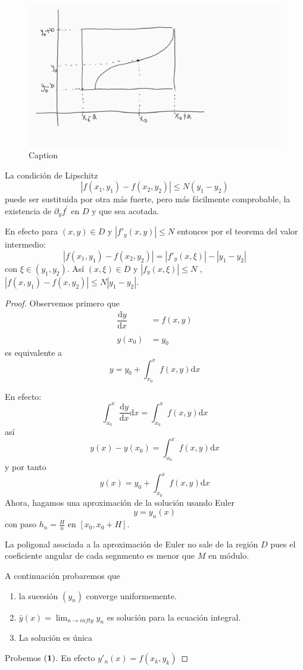 \begin{figure}[H]
    \centering
    \includegraphics[scale=0.25]{graficas1.png}
    \caption{Caption}
    \label{fig:my_label}
\end{figure}


La condici\'on de Lipschitz 
$$
|f(x_1,y_1)-f(x_2,y_2)|\leq N(y_1-y_2)
$$
puede ser sustituida por otra m\'as fuerte, pero m\'as f\'acilmente comprobable, la existencia de $\partial_{y} f^{'}$ en $D$ y que sea acotada.

En efecto para $(x,y)\in D$ y $|f'_y(x,y)|\leq N$ entonces por el teorema del valor intermedio:
$$
|f(x_1,y_1)-f(x_2,y_2)|=|f'_y(x,\xi)|-|y_1-y_2| 
$$
con $\xi\in (y_1,y_2)$. As\'i $(x,\xi)\in D$ y $|f_y(x,\xi)|\leq N$ , $|f(x,y_1)-f(x,y_2)|\leq N|y_1-y_2|$.

\begin{proof}
Observemos primero que 
$$
\left.\begin{array}{cc}
    \dfrac{\mathrm{d}y}{\mathrm{d}x}&=f(x,y)  \\
    &\\
    y(x_0) &=y_0 
\end{array}\right.
$$
es equivalente a
$$
y=y_0+\int_{x_0}^xf(x,y)\mathrm{d}x
$$

En efecto:
$$
\int_{x_0}^x\frac{\mathrm{d}y}{\mathrm{d}x}\mathrm{d}x=\int_{x_0}^xf(x,y)\mathrm{d}x
$$
así
$$
y(x)-y(x_0)=\int_{x_0}^xf(x,y)\mathrm{d}x
$$
y por tanto
$$
y(x)=y_0+\int_{x_0}^xf(x,y)\mathrm{d}x
$$
Ahora, hagamos una aproximaci\'on de  la soluci\'on usando Euler
$$
y=y_n(x)
$$
con paso $h_n=\frac{H}{n}$ en $[x_0,x_0+H]$.

La poligonal asociada a la aproximación de Euler no sale de la región $D$ pues el coeficiente angular de cada segnmento es menor  que $M$ en m\'odulo.

A continuaci\'on probaremos que
\begin{enumerate}
\item la sucesi\'on  $(y_n)$ converge uniformemente.
\item $\bar{y}(x)=\lim_{n\rightarrow infty}y_n$ es soluci\'on para la ecuaci\'on integral.
  \item La soluci\'on es \'unica
\end{enumerate} 

Probemos $\bf{(1)}$. En efecto $y'_n(x)=f(x_k,y_k)$ 


\end{proof}
 